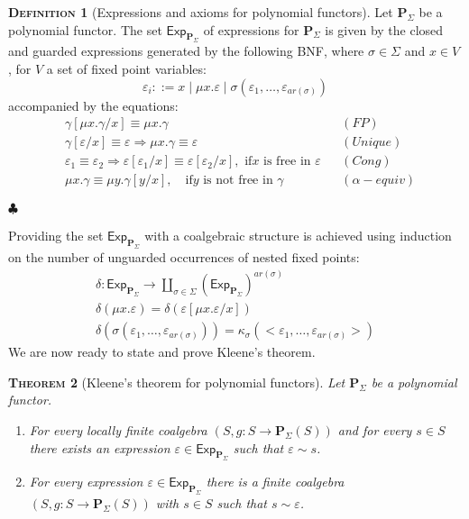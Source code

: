 \documentclass{LMCS}
\newcommand\E\varepsilon
\newcommand\Exp{\mathsf{Exp}}
\newcommand\Pol{\mathbf{P}}
\theoremstyle{definition}
\newtheorem{mydefinition}{\textsc{Definition}}[section]
\theoremstyle{plain}
\theoremstyle{plain}
\newtheorem{mytheorem}[mydefinition]{\textsc{Theorem}}
\theoremstyle{plain}
\theoremstyle{plain}
\theoremstyle{definition}
\theoremstyle{definition}
\newenvironment{definition}{
\begin{mydefinition}}
    {\hfill$\clubsuit$\end{mydefinition}}
\newenvironment{theorem}{
\begin{mytheorem}}
    {\end{mytheorem}}
\begin{document}
\begin{definition}[Expressions and axioms for polynomial functors]
Let $\Pol_\Sigma$ be a polynomial functor. The set $\Exp_{\Pol_\Sigma}$ of expressions for ${\Pol_\Sigma}$ is given by the closed and guarded expressions generated by the following BNF, where $\sigma\in \Sigma$ and $x\in V$, for $V$ a set of fixed point variables:
\[
\E_i ::= x \mid \mu x. \E \mid \sigma(\E_1, \ldots, \E_{\mathit{ar}(\sigma)})
\]
accompanied by the equations:
\begin{align*}
&\gamma[\mu x.\gamma/x] \equiv \mu x . \gamma && \mathit{(FP)}  \\
&{\gamma[\E/x]  \equiv  \E \Rightarrow \mu
x.\gamma \equiv \E} &&\mathit{(Unique)}
\\
&\E_1\equiv \E_2 \Rightarrow \E[\E_1/x]\equiv \E[\E_2/x], \text{\ \ \ \  if
$x$ is free in $\E$}&& (\mathit{Cong})
\\
&\mu x.\gamma \equiv \mu y. \gamma[y/x],\ \ \   \text{ if
$y$ is not free in $\gamma$}& &\mathit {(\alpha-\mathit{equiv})} 
\end{align*}


\end{definition}
Providing the set $\Exp_{\Pol_\Sigma}$ with a coalgebraic structure is
 achieved using induction on the number of unguarded occurrences of nested fixed points:
\[
\begin{array}{l}
\delta \colon \Exp_{\Pol_\Sigma}\to \coprod\limits_{\sigma \in \Sigma} (\Exp_{\Pol_\Sigma})^{\mathit{ar}(\sigma)}\\
\delta(\mu x.\E) = \delta(\E[\mu x.\E /x])\\
\delta(\sigma(\E_1,\ldots,\E_{\mathit{ar}(\sigma)})) = \kappa_\sigma(<\E_1,\ldots,\E_{\mathit{ar}(\sigma)}>) 
\end{array}
\]
We are now ready to state and prove Kleene's theorem.
\begin{theorem}[Kleene's theorem for polynomial functors]
Let $\Pol_\Sigma$ be a polynomial functor.

\begin{enumerate}[\em(1)]
\item  For every locally finite coalgebra $(S,g\colon S\to \Pol_\Sigma(S))$ and for every $s\in S$ there exists an expression  $\E\in \Exp_{\Pol_\Sigma}$ such that $\E\sim s$.
\item For every expression $\E\in \Exp_{\Pol_\Sigma}$ there is a finite  coalgebra $(S, g\colon S\to \Pol_\Sigma(S))$ with $s\in S$ such that $s\sim \E$.
\end{enumerate}
\end{theorem}
\end{document}

